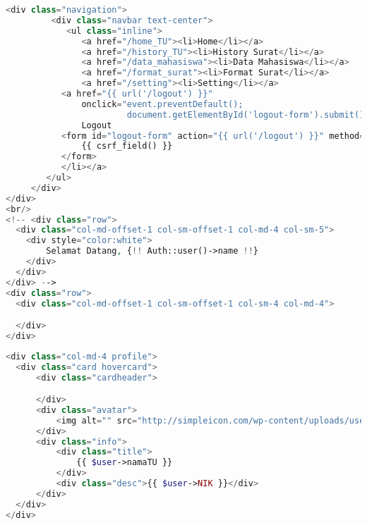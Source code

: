 \begin{lstlisting}[language=php,basicstyle=\tiny,caption=\textit{Navigation bar} untuk petugas TU]
	<div class="navigation">
         <div class="navbar text-center">
            <ul class="inline">
               <a href="/home_TU"><li>Home</li></a>
               <a href="/history_TU"><li>History Surat</li></a>
               <a href="/data_mahasiswa"><li>Data Mahasiswa</li></a>
               <a href="/format_surat"><li>Format Surat</li></a>
               <a href="/setting"><li>Setting</li></a>
           <a href="{{ url('/logout') }}"
               onclick="event.preventDefault();
                        document.getElementById('logout-form').submit();"><li>
               Logout
           <form id="logout-form" action="{{ url('/logout') }}" method="POST" style="display: none;">
               {{ csrf_field() }}
           </form>
           </li></a>
        </ul>
     </div>
</div>
<br/>
<!-- <div class="row">
  <div class="col-md-offset-1 col-sm-offset-1 col-md-4 col-sm-5">
    <div style="color:white">
        Selamat Datang, {!! Auth::user()->name !!}
    </div>
  </div>
</div> -->
<div class="row">
  <div class="col-md-offset-1 col-sm-offset-1 col-sm-4 col-md-4">

  </div>
</div>

\end{lstlisting}

\begin{lstlisting}[language=php,basicstyle=\tiny,caption=\textit{Sidebar} untuk petugas TU]
	<div class="col-md-4 profile">
  <div class="card hovercard">
      <div class="cardheader">

      </div>
      <div class="avatar">
          <img alt="" src="http://simpleicon.com/wp-content/uploads/user1.png">
      </div>
      <div class="info">
          <div class="title">
              {{ $user->namaTU }}
          </div>
          <div class="desc">{{ $user->NIK }}</div>
      </div>
  </div>
</div>

\end{lstlisting}

